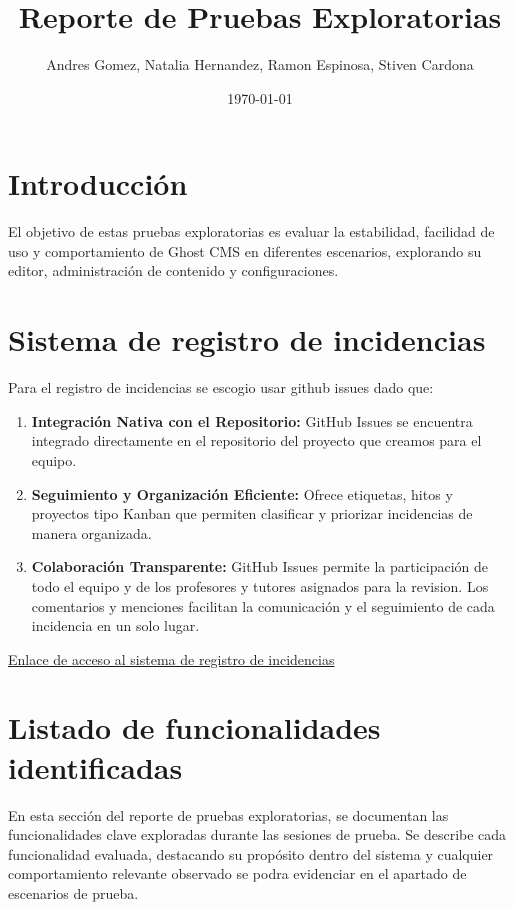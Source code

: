 \documentclass[report,12pt]{article}
\title{\textbf{Reporte de Pruebas Exploratorias}}
\author{Andres Gomez, Natalia Hernandez, Ramon Espinosa, Stiven Cardona}
\date{\today}
\begin{document}
\maketitle

\section{Introducción}
El objetivo de estas pruebas exploratorias es evaluar la estabilidad, facilidad de uso y comportamiento de Ghost CMS en diferentes escenarios, explorando su editor, administración de contenido y configuraciones.

\section{Sistema de registro de incidencias}
Para el registro de incidencias se escogio usar github issues dado que:
\begin{enumerate}
    \item \textbf{Integración Nativa con el Repositorio:} GitHub Issues se encuentra integrado directamente en el repositorio del proyecto que creamos para el equipo.
    \item \textbf{Seguimiento y Organización Eficiente:} Ofrece etiquetas, hitos y proyectos tipo Kanban que permiten clasificar y priorizar incidencias de manera organizada.
    \item \textbf{Colaboración Transparente:} GitHub Issues permite la participación de todo el equipo y de los profesores y tutores asignados para la revision. Los comentarios y menciones facilitan la comunicación y el seguimiento de cada incidencia en un solo lugar.
\end{enumerate}

\href{https://github.com/stivencardonauniandes/pruebas-automatizadas/issues}{Enlace de acceso al sistema de registro de incidencias}

\section{Listado de funcionalidades identificadas}
En esta sección del reporte de pruebas exploratorias, se documentan las funcionalidades clave exploradas durante las sesiones de prueba. Se describe cada funcionalidad evaluada, destacando su propósito dentro del sistema y cualquier comportamiento relevante observado se podra evidenciar en el apartado de escenarios de prueba.
\end{document}
